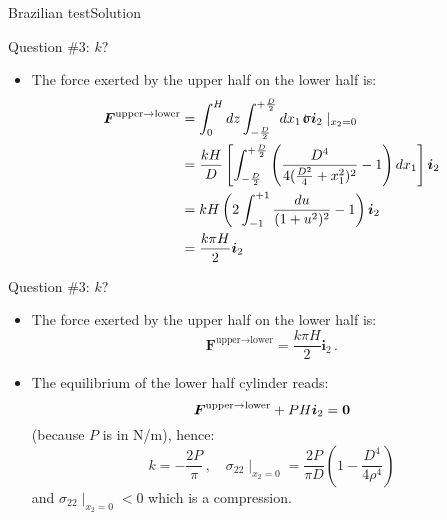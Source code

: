 \documentclass{beamer}
\newcommand{\id}{d}
\newcommand{\xj}{x}
\newcommand{\zj}{z}
\renewcommand{\ij}{i}
\newcommand{\iv}{{\boldsymbol\ij}}
\newcommand{\Fj}{F}
\newcommand{\Fv}{{\boldsymbol\Fj}}
\newcommand*{\stressj}{\sigma}
\newcommand*{\stress}{\mbox{$\hspace{0.3em}\rotatebox[x=0pt,y=0.2pt]{90}{\rule{0.017\linewidth}{0.4pt}}\hspace{-0.25em}\upsigma$}}
\newcommand{\bzero}{{\bf 0}}
\begin{document}
\begin{frame}{Brazilian test}{Solution}
\begin{overprint}
\vskip-20pt
\begin{exampleblock}{Question \#3: $k$?}
\begin{itemize}
\item The force exerted by the upper half on the lower half is:
\begin{displaymath}
\begin{split}
\Fv^\text{upper$\to$lower} &=\int_0^H\id\zj\int_{-\frac{D}{2}}^{+\frac{D}{2}}\id\xj_1\stress\iv_2\mid_{\xj_2=0} \\
&=\frac{kH}{D}\left[\int_{-\frac{D}{2}}^{+\frac{D}{2}}\left(\frac{D^4}{4(\frac{D^2}{4}+\xj_1^2)^2}-1\right)\id\xj_1\right]\iv_2 \\
&=kH\left(2\int_{-1}^{+1}\frac{\id u}{(1+u^2)^2} - 1\right)\iv_2 \\
&=\frac{k\pi H}{2}\iv_2
\end{split}
\end{displaymath}
\end{itemize}
\end{exampleblock}

\vskip-20pt
\begin{exampleblock}{Question \#3: $k$?}
\begin{itemize}
\item The force exerted by the upper half on the lower half is:
\begin{displaymath}
\Fv^\text{upper$\to$lower}=\frac{k\pi H}{2}\iv_2\,.
\end{displaymath}
\item The equilibrium of the lower half cylinder reads:
\begin{displaymath}
\Fv^\text{upper$\to$lower}+PH\iv_2=\bzero
\end{displaymath}
(because $P$ is in N/m), hence:
\begin{displaymath}
k=-\frac{2P}{\pi}\,,\quad\stressj_{22}\mid_{\xj_2=0}=\frac{2P}{\pi D}\left(1-\frac{D^4}{4\rho^4}\right)
\end{displaymath}
and $\stressj_{22}\mid_{\xj_2=0}<0$ which is a compression.
\end{itemize}
\end{exampleblock}

\end{overprint}

\end{frame}
\end{document}
